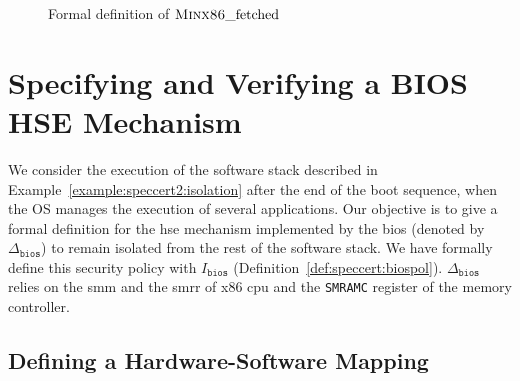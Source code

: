 \begin{figure}
  \begin{prooftree}
  \end{prooftree}

  \begin{prooftree}
  \end{prooftree}

  \caption{Formal definition of \( \textsc{Minx86}\func{\_fetched} \)}
  \label{fig:speccert2:fetchedformal}
\end{figure}

\section{Specifying and Verifying a BIOS HSE Mechanism}
\label{sec:speccert2:verif}

We consider the execution of the software stack described in
Example~\ref{example:speccert2:isolation} after the end of the boot sequence,
when the OS manages the execution of several applications.
%
Our objective is to give a formal definition for the \ac{hse} mechanism
implemented by the \ac{bios} (denoted by \( \Delta_{\mathtt{bios}} \)) to remain
isolated from the rest of the software stack.
%
We have formally define this security policy with $I_{\mathtt{bios}}$
(Definition~\ref{def:speccert:biospol}).
%
\( \Delta_{\mathtt{bios}} \) relies on the \ac{smm} and the \ac{smrr} of x86
\ac{cpu} and the \texttt{SMRAMC} register of the memory controller.

\subsection{Defining a Hardware-Software Mapping}

